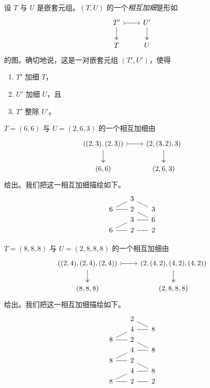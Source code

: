 \begin{definition}
设 $T$ 与 $U$ 是嵌套元组。$(T,U)$ 的一个{\it 相互加细}是形如
\[ \begin{tikzcd}
T' \ar[r,rightarrowtail] \ar[d, two heads] & U' \ar[d,two heads] \\
T & U
\end{tikzcd} \]
的图。确切地说，这是一对嵌套元组 $(T',U')$，使得 \begin{enumerate}
    \item $T'$ 加细 $T$，
    \item $U'$ 加细 $U$，且
    \item $T'$ 整除 $U'$。
\end{enumerate}
\end{definition}

\begin{example}
    $T = (6,6)$ 与 $U = (2,6,3)$ 的一个相互加细由
    \[ \begin{tikzcd}
((2,3),(2,3)) \ar[r,rightarrowtail] \ar[d, two heads] & (2,(3,2),3) \ar[d,two heads] \\
(6,6) & (2,6,3)
\end{tikzcd} \]
给出。我们把这一相互加细描绘如下。
\[ \begin{tikzcd} [row sep = 1, column sep = 8]
  & & 3 & & \\
6 \ar[rr,-] \ar[rru,-] & & 2 & & \ar[ull,-] 3\\
 & & 3 & & \ar[ll,-] \ar[ull,-] 6\\
6 \ar[rr,-] \ar[rru,-] & & 2 & & \ar[ll,-] 2\\
\end{tikzcd} \]
\end{example}

\begin{example}
    $T = (8,8,8)$ 与 $U = (2,8,8,8)$ 的一个相互加细由
    \[ \begin{tikzcd}
 ((2,4),(2,4),(2,4))\ar[r,rightarrowtail] \ar[d, two heads] & (2,(4,2),(4,2),(4,2)) \ar[d,two heads] \\
(8,8,8) & (2,8,8,8)
\end{tikzcd} \]
给出。我们把这一相互加细描绘如下。
\[ \begin{tikzcd} [row sep = 1, column sep = 8]
  & & 2 & & \\
  & & 4 & &\ar[ll,-] \ar[llu,-]  8\\
8 \ar[rr,-] \ar[rru,-]& & 2 & & \\
  & & 4 & &\ar[ll,-] \ar[llu,-]  8\\
8 \ar[rr,-] \ar[rru,-]& & 2 & & \\
  & & 4 & &\ar[ll,-] \ar[llu,-]  8\\
8 \ar[rr,-] \ar[rru,-] & & 2 & & \ar[ll,-] 2\\
\end{tikzcd} \]
\end{example}

